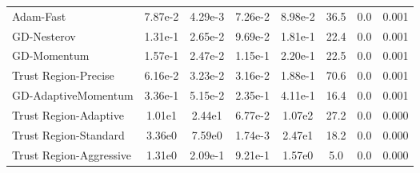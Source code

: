 \documentclass{article}
\begin{document}
\begin{table}[htbp]
{\begin{tabular}{p{2.5cm}*{7}{c}}
Adam-Fast & 7.87e-2 & 4.29e-3 & 7.26e-2 & 8.98e-2 & 36.5 & 0.0 & 0.001 \\
GD-Nesterov & 1.31e-1 & 2.65e-2 & 9.69e-2 & 1.81e-1 & 22.4 & 0.0 & 0.001 \\
GD-Momentum & 1.57e-1 & 2.47e-2 & 1.15e-1 & 2.20e-1 & 22.5 & 0.0 & 0.001 \\
Trust Region-Precise & 6.16e-2 & 3.23e-2 & 3.16e-2 & 1.88e-1 & 70.6 & 0.0 & 0.001 \\
GD-AdaptiveMomentum & 3.36e-1 & 5.15e-2 & 2.35e-1 & 4.11e-1 & 16.4 & 0.0 & 0.001 \\
Trust Region-Adaptive & 1.01e1 & 2.44e1 & 6.77e-2 & 1.07e2 & 27.2 & 0.0 & 0.000 \\
Trust Region-Standard & 3.36e0 & 7.59e0 & 1.74e-3 & 2.47e1 & 18.2 & 0.0 & 0.000 \\
Trust Region-Aggressive & 1.31e0 & 2.09e-1 & 9.21e-1 & 1.57e0 & 5.0 & 0.0 & 0.000 \\
\bottomrule
\end{tabular}
}
\end{table}
\end{document}
